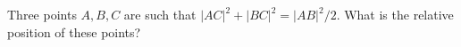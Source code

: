 Three points $A, B, C$ are such that $|AC|^2 + |BC|^2 = |AB|^2/2$. What is the relative position of these points?
